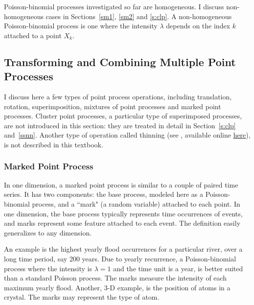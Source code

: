 \documentclass[10pt]{article}
\begin{document}
Poisson-binomial processes investigated so far are homogeneous. I discuss non-homogeneous cases in Sections~\ref{sm1}, \ref{sm2} and \ref{s:clp}. A non-homogeneous Poisson-binomial process is one where the intensity $\lambda$ depends on the index $k$ attached to a point $X_k$.

\subsection{Transforming and Combining Multiple Point Processes}\label{trtr}

I discuss here a few types of \textcolor{index}{point process operations}, including translation, rotation, superimposition, mixtures of point processes and marked point processes. Cluster point processes, a particular type of superimposed processes, are not introduced in this section: they are treated in detail in Section~\ref{s:clp}
and~\ref{ssnn}. Another type of operation called \textcolor{index}{thinning} (see \cite{thinned}, available online \href{http://www.stat.ucla.edu/~frederic/papers/thinning8b.pdf}{here}), is not described in this textbook.

\subsubsection{Marked Point Process}\label{mpp}

In one dimension, a \textcolor{index}{marked point process}  is similar to a couple of paired time series. It has two components: the base process, modeled here as a Poisson-binomial process, and a ``mark" (a random variable) attached to each point. In one dimension, the base process typically represents time occurrences of events, and marks represent some feature attached to each event. The definition easily generalizes to any dimension.

An example is the highest yearly flood occurrences for a particular river, over a long time period, say 200 years. Due to yearly recurrence,  a Poisson-binomial process where the intensity is $\lambda=1$ and the time unit is a year, is better suited than a standard Poisson process. The marks measure the intensity of each maximum yearly flood. Another, 3-D example, is the position of atoms in a crystal. The marks may represent the type of atom.
\end{document}
